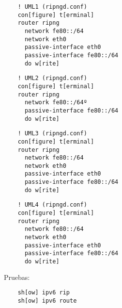   \begin{verbatim}
    ! UML1 (ripngd.conf)
    con[figure] t[erminal]
    router ripng
      network fe80::/64
      network eth0
      passive-interface eth0
      passive-interface fe80::/64
      do w[rite]
  \end{verbatim}

  \begin{verbatim}
    ! UML2 (ripngd.conf)
    con[figure] t[erminal]
    router ripng
      network fe80::/64º
      passive-interface fe80::/64
      do w[rite]
  \end{verbatim}

  \begin{verbatim}
    ! UML3 (ripngd.conf)
    con[figure] t[erminal]
    router ripng
      network fe80::/64
      network eth0
      passive-interface eth0
      passive-interface fe80::/64
      do w[rite]
  \end{verbatim}

  \begin{verbatim}
    ! UML4 (ripngd.conf)
    con[figure] t[erminal]
    router ripng
      network fe80::/64
      network eth0
      passive-interface eth0
      passive-interface fe80::/64
      do w[rite]
  \end{verbatim}

  Pruebas:
  \begin{verbatim}
    sh[ow] ipv6 rip
    sh[ow] ipv6 route
  \end{verbatim}